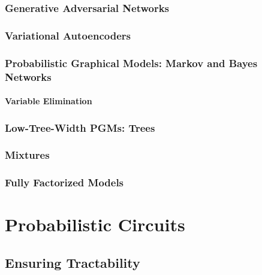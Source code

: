 			\subsubsection{Generative Adversarial Networks} %

			\subsubsection{Variational Autoencoders} %

			\subsubsection{Probabilistic Graphical Models: Markov and Bayes Networks} %

				\paragraph{Variable Elimination} %

			\subsubsection{Low-Tree-Width PGMs: Trees} %

			\subsubsection{Mixtures} %

			\subsubsection{Fully Factorized Models} %

	\section{Probabilistic Circuits} %

		\subsection{Ensuring Tractability} %

